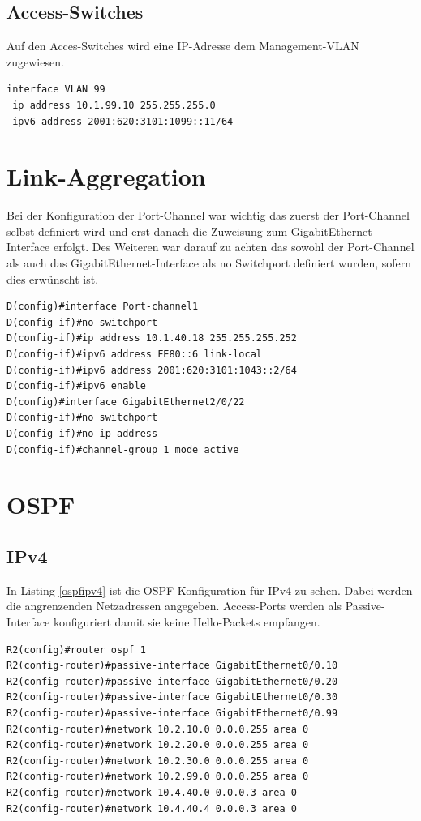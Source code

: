 \documentclass[11pt,a4paper]{scrreprt}
\begin{document}
\subsection{Access-Switches}
Auf den Acces-Switches wird eine IP-Adresse dem Management-\acs{VLAN} zugewiesen.
\newline
\begin{lstlisting}[frame=single, captionpos=b,caption= Access-Switch IP-Konfiguration]
interface VLAN 99
 ip address 10.1.99.10 255.255.255.0
 ipv6 address 2001:620:3101:1099::11/64
\end{lstlisting}

\section{Link-Aggregation} \label{linkaggre}
Bei der Konfiguration der Port-Channel war wichtig das zuerst der Port-Channel selbst definiert wird und erst danach die Zuweisung zum GigabitEthernet-Interface erfolgt. Des Weiteren war darauf zu achten das sowohl der Port-Channel als auch das GigabitEthernet-Interface als no Switchport definiert wurden, sofern dies erwünscht ist.
\newline
\begin{lstlisting}[frame=single, captionpos=b,caption= Switch Grund Konfiguration]
D(config)#interface Port-channel1
D(config-if)#no switchport
D(config-if)#ip address 10.1.40.18 255.255.255.252
D(config-if)#ipv6 address FE80::6 link-local
D(config-if)#ipv6 address 2001:620:3101:1043::2/64
D(config-if)#ipv6 enable
D(config)#interface GigabitEthernet2/0/22
D(config-if)#no switchport
D(config-if)#no ip address
D(config-if)#channel-group 1 mode active
\end{lstlisting}

\section{OSPF}
\subsection{IPv4}
In Listing \ref{ospfipv4} ist die OSPF Konfiguration für IPv4 zu sehen. Dabei werden die angrenzenden Netzadressen angegeben. Access-Ports werden als Passive-Interface konfiguriert damit sie keine Hello-Packets empfangen.
\newline
\begin{lstlisting}[frame=single, captionpos=b,caption= OSPF IPv4, label=ospfipv4]
R2(config)#router ospf 1
R2(config-router)#passive-interface GigabitEthernet0/0.10
R2(config-router)#passive-interface GigabitEthernet0/0.20
R2(config-router)#passive-interface GigabitEthernet0/0.30
R2(config-router)#passive-interface GigabitEthernet0/0.99
R2(config-router)#network 10.2.10.0 0.0.0.255 area 0
R2(config-router)#network 10.2.20.0 0.0.0.255 area 0
R2(config-router)#network 10.2.30.0 0.0.0.255 area 0
R2(config-router)#network 10.2.99.0 0.0.0.255 area 0
R2(config-router)#network 10.4.40.0 0.0.0.3 area 0
R2(config-router)#network 10.4.40.4 0.0.0.3 area 0
\end{lstlisting}
\end{document}
